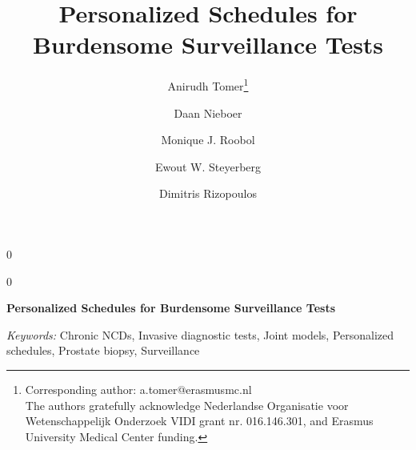 \documentclass[12pt]{article}
\newcommand{\blind}{0}
\begin{document}
%

\def\spacingset#1{\renewcommand{\baselinestretch}%
{#1}\small\normalsize} \spacingset{1}



\blind
{
  \title{\bf Personalized Schedules for Burdensome Surveillance Tests}

\author[1]{Anirudh Tomer\footnote{Corresponding author: a.tomer@erasmusmc.nl\\The authors gratefully acknowledge Nederlandse Organisatie voor Wetenschappelijk Onderzoek VIDI grant nr. 016.146.301, and Erasmus University Medical Center funding.}}
\author[2]{Daan Nieboer}
\author[3]{Monique J. Roobol}
\author[2,4]{Ewout W. Steyerberg}
\author[1]{Dimitris Rizopoulos}




  \maketitle
} \fi

\blind
{
  \bigskip
  \bigskip
  \bigskip
  \begin{center}
    {\LARGE\bf Personalized Schedules for Burdensome Surveillance Tests}
\end{center}
  \medskip
} \fi

\bigskip

\noindent%
{\it Keywords:} Chronic NCDs, Invasive diagnostic tests, Joint models, Personalized schedules, Prostate biopsy, Surveillance
\vfill

\newpage
\spacingset{1.5} %


\clearpage

\clearpage

\clearpage

\clearpage




\end{document}
